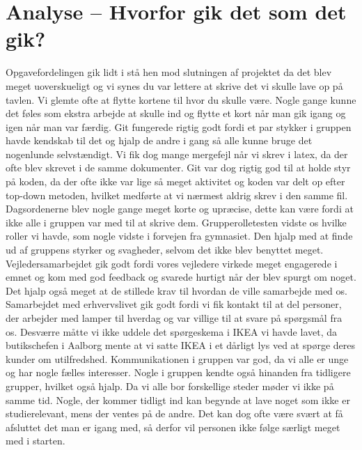 \documentclass[oneside,a4paper,titlepage]{article}
\begin{document}
\section{Analyse – Hvorfor gik det som det gik?}
Opgavefordelingen gik lidt i stå hen mod slutningen af projektet da det blev meget uoverskueligt og vi synes du var lettere at skrive det vi skulle lave op på tavlen. Vi glemte ofte at flytte kortene til hvor du skulle være. Nogle gange kunne det føles som ekstra arbejde at skulle ind og flytte et kort når man gik igang og igen når man var færdig. \newline\newline
Git fungerede rigtig godt fordi et par stykker i gruppen havde kendskab til det og hjalp de andre i gang så alle kunne bruge det nogenlunde selvstændigt. Vi fik dog mange mergefejl når vi skrev i latex, da der ofte blev skrevet i de samme dokumenter. Git var dog rigtig god til at holde styr på koden, da der ofte ikke var lige så meget aktivitet og koden var delt op efter top-down metoden, hvilket medførte at vi nærmest aldrig skrev i den samme fil. \newline\newline
Dagsordenerne blev nogle gange meget korte og upræcise, dette kan være fordi at ikke alle i gruppen var med til at skrive dem. 
Grupperolletesten vidste os hvilke roller vi havde, som nogle vidste i forvejen fra gymnasiet. Den hjalp med at finde ud af gruppens styrker og svagheder, selvom det ikke blev benyttet meget. 
Vejledersamarbejdet gik godt fordi vores vejledere virkede meget engagerede i emnet og kom med god feedback og svarede hurtigt når der blev spurgt om noget. Det hjalp også meget at de stillede krav til hvordan de ville samarbejde med os. 
Samarbejdet med erhvervslivet gik godt fordi vi fik kontakt til at del personer, der arbejder med lamper til hverdag og var villige til at svare på spørgsmål fra os. Desværre måtte vi ikke uddele det spørgeskema i IKEA vi havde lavet, da butikschefen i Aalborg mente at vi satte IKEA i et dårligt lys ved at spørge deres kunder om utilfredshed. \newline\newline
Kommunikationen i gruppen var god, da vi alle er unge og har nogle fælles interesser. Nogle i gruppen kendte også hinanden fra tidligere grupper, hvilket også hjalp.
Da vi alle bor forskellige steder møder vi ikke på samme tid. Nogle, der kommer tidligt ind kan begynde at lave noget som ikke er studierelevant, mens der ventes på de andre. Det kan dog ofte være svært at få afsluttet det man er igang med, så derfor vil personen ikke følge særligt meget med i starten. 
\end{document}
